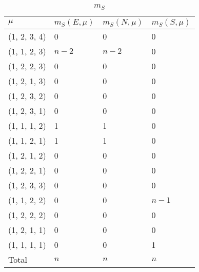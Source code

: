 \documentclass{article}
\begin{document}
\begin{table}[h]
\centering
\begin{tabular}{llll}
\multicolumn{1}{l|}{$\mu$}        & $m_S(E, \mu)$ & $m_S(N, \mu)$ & $m_S(S, \mu)$ \\ \hline
\multicolumn{1}{l|}{(1, 2, 3, 4)} & 0           & 0        & 0             \\
\multicolumn{1}{l|}{(1, 1, 2, 3)} & $n-2$             & $n-2$             & 0             \\
\multicolumn{1}{l|}{(1, 2, 2, 3)} & 0           & 0             & 0             \\
\multicolumn{1}{l|}{(1, 2, 1, 3)} & 0           & 0             & 0             \\
\multicolumn{1}{l|}{(1, 2, 3, 2)} & 0           & 0             & 0             \\
\multicolumn{1}{l|}{(1, 2, 3, 1)} & 0           & 0             & 0             \\
\multicolumn{1}{l|}{(1, 1, 1, 2)} & 1             & 1             & 0             \\
\multicolumn{1}{l|}{(1, 1, 2, 1)} & 1             & 1             & 0             \\
\multicolumn{1}{l|}{(1, 2, 1, 2)} & 0             & 0             & 0             \\
\multicolumn{1}{l|}{(1, 2, 2, 1)} & 0             & 0             & 0             \\
\multicolumn{1}{l|}{(1, 2, 3, 3)} & 0             & 0             & 0        \\
\multicolumn{1}{l|}{(1, 1, 2, 2)} & 0             & 0             & $n-1$             \\
\multicolumn{1}{l|}{(1, 2, 2, 2)} & 0             & 0             & 0             \\
\multicolumn{1}{l|}{(1, 2, 1, 1)} & 0             & 0             & 0             \\
\multicolumn{1}{l|}{(1, 1, 1, 1)} & 0             & 0             & 1             \\ \hline
\multicolumn{1}{l|}{Total}                             & $n$            & $n$            & $n $          
\end{tabular}
\caption{$m_S$}
\label{table:mS}
\end{table}

\newpage
\end{document}
